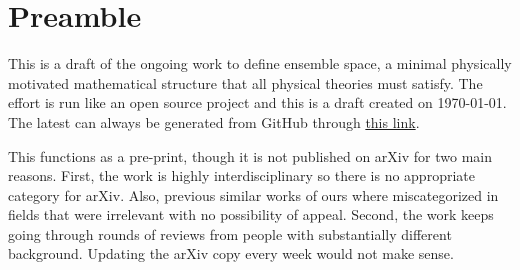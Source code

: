 \documentclass[11pt,letterpaper,fleqn]{memoir}
\begin{document}
%	
	
%	
\chapter*{Preamble}

This is a draft of the ongoing work to define ensemble space, a minimal physically motivated mathematical structure that all physical theories must satisfy. The effort is run like an open source project and this is a draft created on \today. The latest can always be generated from GitHub through \href{https://latexonline.cc/compile?git=https%3A%2F%2Fgithub.com%2Fassumptionsofphysics%2Fbook&target=art_pm_EnsembleSpaces.tex&command=pdflatex}{this link}.

This functions as a pre-print, though it is not published on arXiv for two main reasons. First, the work is highly interdisciplinary so there is no appropriate category for arXiv. Also, previous similar works of ours where miscategorized in fields that were irrelevant with no possibility of appeal. Second, the work keeps going through rounds of reviews from people with substantially different background. Updating the arXiv copy every week would not make sense.

\setcounter{tocdepth}{3}
\tableofcontents
	
	
	
	
\end{document}

